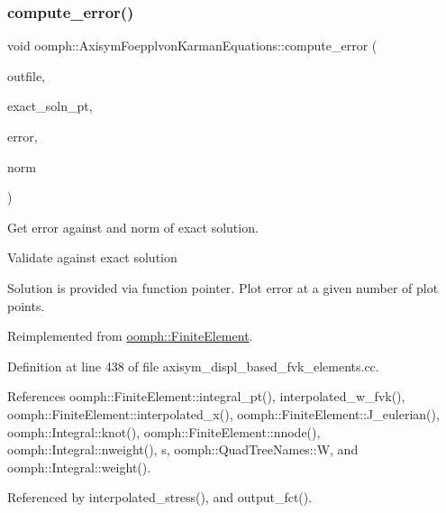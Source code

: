 \subsubsection{\texorpdfstring{compute\+\_\+error()}{compute\_error()}\hspace{0.1cm}{\footnotesize\ttfamily [3/4]}}
{\footnotesize\ttfamily void oomph\+::\+Axisym\+Foepplvon\+Karman\+Equations\+::compute\+\_\+error (\begin{DoxyParamCaption}\item[{std\+::ostream \&}]{outfile,  }\item[{\hyperlink{classoomph_1_1FiniteElement_a690fd33af26cc3e84f39bba6d5a85202}{Finite\+Element\+::\+Steady\+Exact\+Solution\+Fct\+Pt}}]{exact\+\_\+soln\+\_\+pt,  }\item[{double \&}]{error,  }\item[{double \&}]{norm }\end{DoxyParamCaption})\hspace{0.3cm}{\ttfamily [virtual]}}



Get error against and norm of exact solution. 

Validate against exact solution

Solution is provided via function pointer. Plot error at a given number of plot points. 

Reimplemented from \hyperlink{classoomph_1_1FiniteElement_a73c79a1f1e5b1d334757812a6bbd58ff}{oomph\+::\+Finite\+Element}.



Definition at line 438 of file axisym\+\_\+displ\+\_\+based\+\_\+fvk\+\_\+elements.\+cc.



References oomph\+::\+Finite\+Element\+::integral\+\_\+pt(), interpolated\+\_\+w\+\_\+fvk(), oomph\+::\+Finite\+Element\+::interpolated\+\_\+x(), oomph\+::\+Finite\+Element\+::\+J\+\_\+eulerian(), oomph\+::\+Integral\+::knot(), oomph\+::\+Finite\+Element\+::nnode(), oomph\+::\+Integral\+::nweight(), s, oomph\+::\+Quad\+Tree\+Names\+::W, and oomph\+::\+Integral\+::weight().



Referenced by interpolated\+\_\+stress(), and output\+\_\+fct().

\mbox{\label{classoomph_1_1AxisymFoepplvonKarmanEquations_a239536a30ed45a68f678037b9bdc7c9b}} 
